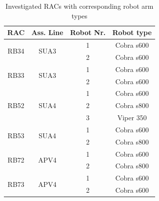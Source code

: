 \begin{table}[ht]
\begin{center}
\caption[Investigated RACs with corresponding robot arm types]{Investigated RACs with corresponding robot arm types} \label{tab:InvestigatedRACs}
\begin{tabular}[width=\textwidth]{c|c|c|c}
RAC & Ass. Line & Robot Nr. & Robot type \\ 
\hline
\multirow{2}{*}{RB34} & \multirow{2}{*}{SUA3} & 1 & Cobra s600 \\
& & 2 & Cobra s600 \\
\hline
\multirow{2}{*}{RB33} & \multirow{2}{*}{SUA3} & 1 & Cobra s600 \\
& & 2 & Cobra s600 \\
\hline
\multirow{3}{*}{RB52} & \multirow{3}{*}{SUA4} & 1 & Cobra s600 \\
& & 2 & Cobra s800 \\
& & 3 & Viper 350 \\
\hline
\multirow{2}{*}{RB53} & \multirow{2}{*}{SUA4} & 1 & Cobra s600 \\
& & 2 & Cobra s800 \\
\hline
\multirow{2}{*}{RB72} & \multirow{2}{*}{APV4} & 1 & Cobra s600 \\
& & 2 & Cobra s800 \\
\hline
\multirow{2}{*}{RB73} &\multirow{2}{*}{APV4} & 1 & Cobra s600 \\
& & 2 & Cobra s600 \\
\end{tabular}
\end{center}
\end{table}

